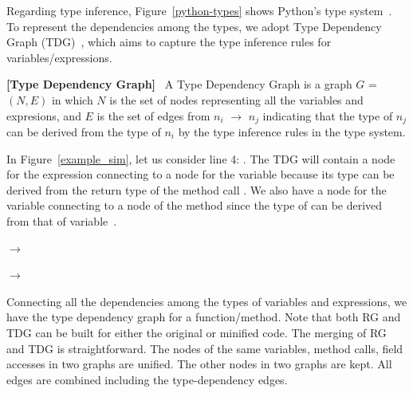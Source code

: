 Regarding type inference, Figure~\ref{python-types} shows Python's
type system~\cite{HiTyper-icse22}. To represent the dependencies among
the types, we adopt Type Dependency Graph (TDG)~\cite{HiTyper-icse22},
which aims to capture the type inference rules for
variables/expressions.

\begin{definition}{\bf [Type Dependency Graph]}~\cite{HiTyper-icse22}
    \label{tdg-def}
A Type Dependency Graph is a graph $G$ = $(N,E)$ in which $N$ is the
set of nodes representing all the variables and expresions, and $E$ is
the set of edges from $n_i$ $\rightarrow$ $n_j$ indicating that the type of $n_j$
can be derived from the type of $n_i$ by the type inference rules in
the type system.
\end{definition}

In Figure~\ref{example_sim}, let us consider line 4: . The TDG will contain a node for the expression
 connecting to a node for the variable 
because its type can be derived from the return type of the method
call . We also have a node for the variable
 connecting to a node of the method 
since the type of  can be derived from
that of variable~.

 $\rightarrow$ 

 $\rightarrow$  


Connecting all the dependencies among the types of variables and
expressions, we have the type dependency graph for a
function/method. Note that both RG and TDG can be built for either
the original or minified code. The merging of RG and TDG is
straightforward. The nodes of the same variables, method calls, field
accesses in two graphs are unified.  The other nodes in two graphs are
kept. All edges are combined including the type-dependency edges.

